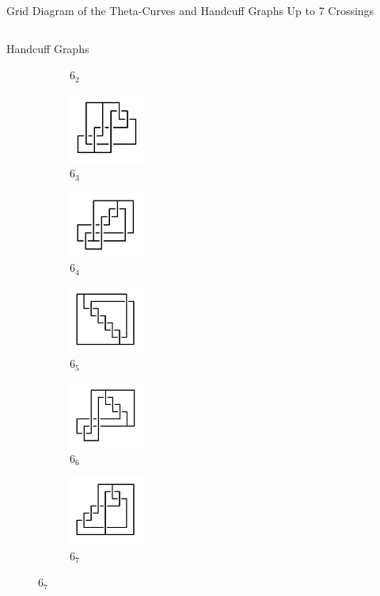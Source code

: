\documentclass[final]{beamer}
\begin{document}
\begin{frame}[t]
\begin{alertblock}{Grid Diagram of the Theta-Curves and Handcuff Graphs Up to 7 Crossings}
\begin{columns}[t]
\begin{column}{0.3\textwidth}
\begin{alertblock}{Handcuff Graphs}
\begin{figure}
\begin{subfigure}{0.15\textwidth}
    \caption{$6_{2}$} 
    \end{subfigure}
    \begin{subfigure}{0.15\textwidth}
    \includegraphics[width=2.5cm]{../Midterm_Poster/grid_diagram/handcuff_6_3.png}
    \caption{$6_{3}$} 
    \end{subfigure}
    \begin{subfigure}{0.15\textwidth}
    \includegraphics[width=2.5cm]{../Midterm_Poster/grid_diagram/handcuff_6_4.png}
    \caption{$6_{4}$} 
    \end{subfigure}
    \begin{subfigure}{0.15\textwidth}
    \includegraphics[width=2.5cm]{../Midterm_Poster/grid_diagram/handcuff_6_5.png}
    \caption{$6_{5}$} 
    \end{subfigure}
    \begin{subfigure}{0.15\textwidth}
    \includegraphics[width=2.5cm]{../Midterm_Poster/grid_diagram/handcuff_6_6.png}
    \caption{$6_{6}$} 
    \end{subfigure}
    \begin{subfigure}{0.15\textwidth}
    \includegraphics[width=2.5cm]{../Midterm_Poster/grid_diagram/handcuff_6_7.png}
    \caption{$6_{7}$} 
    \end{subfigure}

\end{figure}
\end{alertblock}
\end{column}
\end{columns}
\end{alertblock}
\end{frame}
\end{document}
